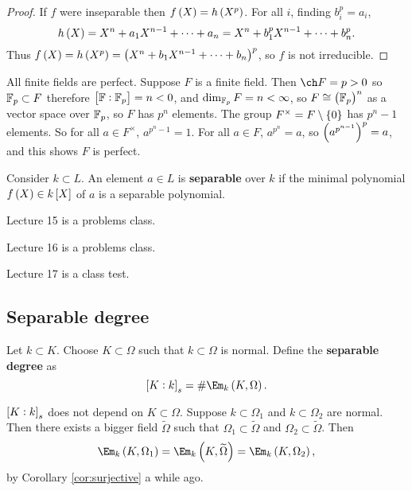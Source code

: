 \begin{proof}
If $ f $ were inseparable then $ f\br{X} = h\br{X^p} $. For all $ i $, finding $ b_i^p = a_i $,
$$ h\br{X} = X^n + a_1X^{n - 1} + \dots + a_n = X^n + b_1^pX^{n - 1} + \dots + b_n^p. $$
Thus $ f\br{X} = h\br{X^p} = \br{X^n + b_1X^{n - 1} + \dots + b_n}^p $, so $ f $ is not irreducible.
\end{proof}

\begin{example*}
All finite fields are perfect. Suppose $ F $ is a finite field. Then $ \ch F = p > 0 $ so $ \mathbb{F}_p \subset F $ therefore $ \sbr{\FF : \FF_p} = n < 0 $, and $ \dim_{\mathbb{F}_p} F = n < \infty $, so $ F \cong \br{\FF_p}^n $ as a vector space over $ \mathbb{F}_p $, so $ F $ has $ p^n $ elements. The group $ F^\times = F \setminus \cbr{0} $ has $ p^n - 1 $ elements. So for all $ a \in F^\times $, $ a^{p^n - 1} = 1 $. For all $ a \in F $, $ a^{p^n} = a $, so $ \br{a^{p^{n - 1}}}^p = a $, and this shows $ F $ is perfect.
\end{example*}

\begin{definition}
Consider $ k \subset L $. An element $ a \in L $ is \textbf{separable} over $ k $ if the minimal polynomial $ f\br{X} \in k\sbr{X} $ of $ a $ is a separable polynomial.
\end{definition}


Lecture 15 is a problems class.


Lecture 16 is a problems class.


Lecture 17 is a class test.

\subsection{Separable degree}


\begin{definition}
Let $ k \subset K $. Choose $ K \subset \Omega $ such that $ k \subset \Omega $ is normal. Define the \textbf{separable degree} as
$$ \sbr{K : k}_s = \#\Em_k\br{K, \Omega}. $$
\end{definition}

\begin{remark*}
$ \sbr{K : k}_s $ does not depend on $ K \subset \Omega $. Suppose $ k \subset \Omega_1 $ and $ k \subset \Omega_2 $ are normal. Then there exists a bigger field $ \widetilde{\Omega} $ such that $ \Omega_1 \subset \widetilde{\Omega} $ and $ \Omega_2 \subset \widetilde{\Omega} $. Then
$$ \Em_k\br{K, \Omega_1} = \Em_k\br{K, \widetilde{\Omega}} = \Em_k\br{K, \Omega_2}, $$
by Corollary \ref{cor:surjective} a while ago.
\end{remark*}

